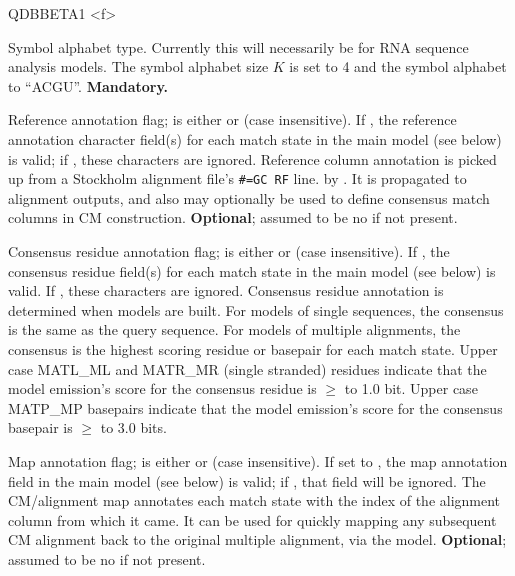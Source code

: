 \begin{sreitems}{QDBBETA1 <f>}
\item [\emprog{ALPH <s>}] Symbol alphabet type. Currently this will
necessarily be  for RNA sequence analysis models.
The symbol alphabet size $K$ is set to 4 and the 
symbol alphabet to ``ACGU''. \textbf{Mandatory.}

\item [\emprog{RF <s>}] Reference annotation flag;  is
either  or  (case insensitive). If , the
reference annotation character field(s) for each match state in the
main model (see below) is valid; if , these characters are
ignored.  Reference column annotation is picked up from a Stockholm
alignment file's \verb+#=GC RF+ line. by . It is
propagated to alignment outputs, and also may optionally be used to
define consensus match columns in CM 
construction. \textbf{Optional}; assumed to be no if not present.

\item [\emprog{CONS <s>}] Consensus residue annotation flag;
   is either  or  (case insensitive).  If
  , the consensus residue field(s) for each match state in
  the main model (see below) is valid. If , these characters
  are ignored. Consensus residue annotation is determined when models
  are built. For models of single sequences, the consensus is the same
  as the query sequence. For models of multiple alignments, the
  consensus is the highest scoring residue or basepair for each match
  state. Upper case MATL\_ML and MATR\_MR (single stranded) residues
  indicate that the model emission's score for the consensus residue
  is $\geq$ to 1.0 bit. Upper case MATP\_MP basepairs indicate that
  the model emission's score for the consensus basepair is $\geq$ to
  3.0 bits.

\item [\emprog{MAP <s>}] Map annotation flag;  is either
 or  (case insensitive).  If set to , the
map annotation field in the main model (see below) is valid; if
, that field will be ignored.  The CM/alignment map
annotates each match state with the index of the alignment column from
which it came. It can be used for quickly mapping any subsequent
CM alignment back to the original multiple alignment, via the model.
\textbf{Optional}; assumed to be no if not present.


\end{sreitems}

